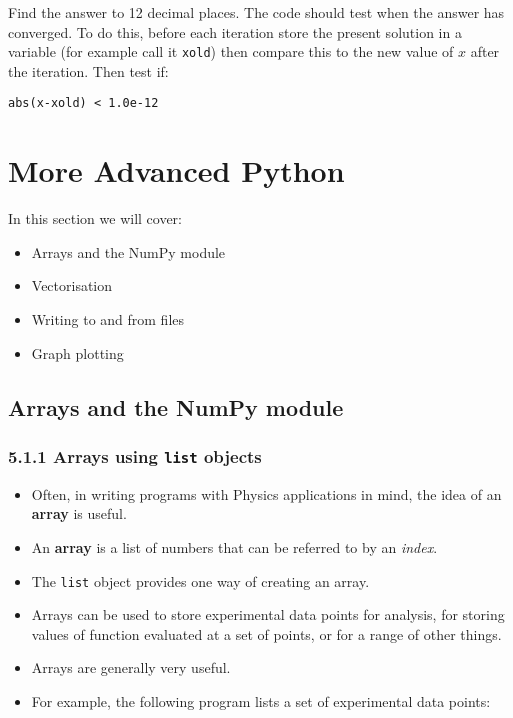 \documentclass[10pt]{article}
\providecommand{\tightlist}{%
      \setlength{\itemsep}{0pt}\setlength{\parskip}{0pt}}
\begin{document}
Find the answer to 12 decimal places. The code should test when the
answer has converged. To do this, before each iteration store the
present solution in a variable (for example call it \texttt{xold}) then
compare this to the new value of \(x\) after the iteration. Then test
if:

\begin{verbatim}
abs(x-xold) < 1.0e-12
\end{verbatim}

    \hypertarget{more-advanced-python}{%
\section{More Advanced Python}\label{more-advanced-python}}

In this section we will cover: \begin{itemize}
\item Arrays and the NumPy module \item
Vectorisation \item Writing to and from files \item Graph plotting
\end{itemize}


\hypertarget{arrays-and-the-numpy-module}{%
\subsection{Arrays and the NumPy
module}\label{arrays-and-the-numpy-module}}

\hypertarget{arrays-using-list-objects}{%
\subsubsection*{\texorpdfstring{5.1.1 Arrays using \texttt{list}
objects}{5.1.1 Arrays using list objects}}\label{arrays-using-list-objects}}

\begin{itemize}
\tightlist
\item
  Often, in writing programs with Physics applications in mind, the idea
  of an \textbf{array} is useful.
\item
  An \textbf{array} is a list of numbers that can be referred to by an
  \emph{index}.
\item
  The \texttt{list} object provides one way of creating an array.
\item
  Arrays can be used to store experimental data points for analysis, for
  storing values of function evaluated at a set of points, or for a
  range of other things.
\item
  Arrays are generally very useful.
\item
  For example, the following program lists a set of experimental data
  points:
\end{itemize}
\end{document}
